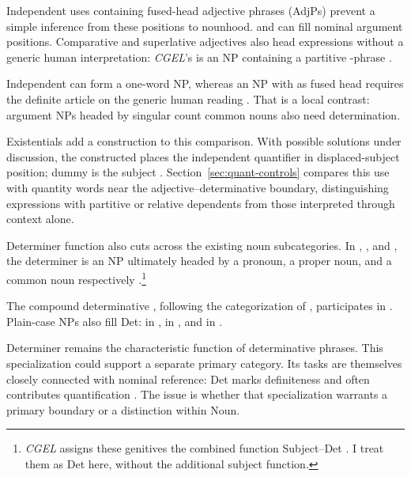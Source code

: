 \documentclass[12pt]{article}
\begin{document}
Independent uses containing fused-head adjective phrases (AdjPs) prevent a simple inference from these positions to nounhood.  and  can fill nominal argument positions. Comparative and superlative adjectives also head expressions without a generic human interpretation: \textit{CGEL}'s  is an NP containing a partitive -phrase \citep[332--333, 416--423]{huddleston2002}.

Independent  can form a one-word NP, whereas an NP with  as fused head requires the definite article  on the generic human reading \citep[417--418]{huddleston2002}. That is a local contrast: argument NPs headed by singular count common nouns also need determination.

Existentials add a construction to this comparison. With possible solutions under discussion, the constructed  places the independent quantifier in displaced-subject position; dummy  is the subject \citep[1391--1393]{huddleston2002}. Section~\ref{sec:quant-controls} compares this use with quantity words near the adjective--determinative boundary, distinguishing expressions with partitive or relative dependents from those interpreted through context alone.

Determiner function also cuts across the existing noun subcategories. In , , and , the determiner is an NP ultimately headed by a pronoun, a proper noun, and a common noun respectively \citep[354--355, 470--471]{huddleston2002}.\footnote{\textit{CGEL} assigns these genitives the combined function Subject--Det \citep[472--473]{huddleston2002}. I treat them as Det here, without the additional subject function.}

The compound determinative , following the categorization of \textcite[§1.3]{Payne2007}, participates in . Plain-case NPs also fill Det:  in ,  in , and  in  \citep[356]{huddleston2002}.

Determiner remains the characteristic function of determinative phrases. This specialization could support a separate primary category. Its tasks are themselves closely connected with nominal reference: Det marks definiteness and often contributes quantification \citep[354--359]{huddleston2002}. The issue is whether that specialization warrants a primary boundary or a distinction within Noun.
\end{document}
